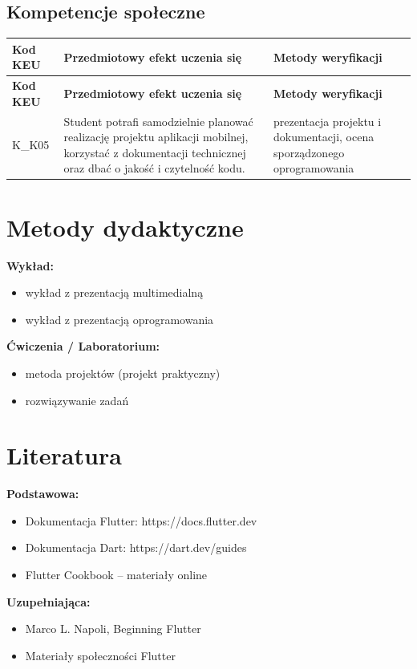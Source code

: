 \documentclass[12pt, a4paper]{article}
\newcommand{\thdrule}{\noalign{\global\setlength{\extrarowheight}{0pt}}}
\newcommand{\thdend}{\noalign{\global\setlength{\extrarowheight}{3pt}}}
\begin{document}
\subsection*{Kompetencje społeczne}
{\scriptsize
\begin{longtable}{m{1.6cm}m{9.0cm}m{4.2cm}}
\thdrule\toprule
\rowcolor{pjatkRed} {\color{white}\footnotesize\textbf{\vphantom{Ag}Kod KEU}} & {\color{white}\footnotesize\textbf{\vphantom{Ag}Przedmiotowy efekt uczenia się}} & {\color{white}\footnotesize\textbf{\vphantom{Ag}Metody weryfikacji}} \\
\midrule\thdend
\endfirsthead
\thdrule\toprule
\rowcolor{pjatkRed} {\color{white}\footnotesize\textbf{\vphantom{Ag}Kod KEU}} & {\color{white}\footnotesize\textbf{\vphantom{Ag}Przedmiotowy efekt uczenia się}} & {\color{white}\footnotesize\textbf{\vphantom{Ag}Metody weryfikacji}} \\
\midrule\thdend
\endhead
  \rowcolor{tableRowLight} K\_K05 & Student potrafi samodzielnie planować realizację projektu aplikacji mobilnej, korzystać z dokumentacji technicznej oraz dbać o jakość i czytelność kodu. & prezentacja projektu i dokumentacji, ocena sporządzonego oprogramowania \\
\bottomrule
\end{longtable}}

\section{Metody dydaktyczne}

\textbf{Wykład:}
\begin{itemize}
  \item wykład z prezentacją multimedialną
  \item wykład z prezentacją oprogramowania
\end{itemize}
\vspace{4pt}
\textbf{Ćwiczenia / Laboratorium:}
\begin{itemize}
  \item metoda projektów (projekt praktyczny)
  \item rozwiązywanie zadań
\end{itemize}
\vspace{4pt}


\section{Literatura}

\textbf{Podstawowa:}
\begin{itemize}
  \item Dokumentacja Flutter: https://docs.flutter.dev
  \item Dokumentacja Dart: https://dart.dev/guides
  \item Flutter Cookbook – materiały online
\end{itemize}

\textbf{Uzupełniająca:}
\begin{itemize}
  \item Marco L. Napoli, Beginning Flutter
  \item Materiały społeczności Flutter
\end{itemize}
\end{document}
